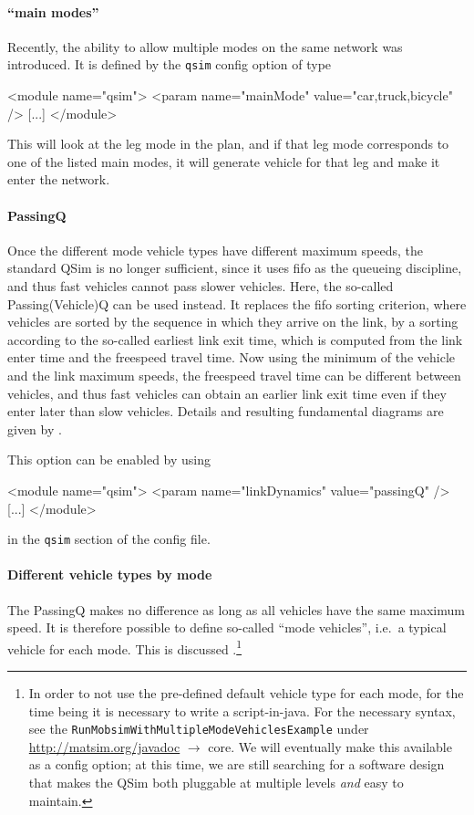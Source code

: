 \paragraph{``main modes''}
Recently, the ability to allow multiple modes on the same network was introduced.  It is defined by the \lstinline{qsim} config option of type
\begin{xml}
<module name="qsim">
   <param name="mainMode" value="car,truck,bicycle" />
   [...]
</module>
\end{xml}
This will look at the leg mode in the plan, and if that leg mode corresponds to one of the listed main modes, it will generate vehicle for that leg and make it enter the network.


\paragraph{PassingQ} Once the different mode vehicle types have different maximum speeds, the standard QSim is no longer sufficient, since it uses \acrfull{fifo} as the queueing discipline, and thus fast vehicles cannot pass slower vehicles.  Here, the so-called Passing(Vehicle)Q can be used instead.  It replaces the \gls{fifo} sorting criterion, where vehicles are sorted by the sequence in which they arrive on the link, by a sorting according to the so-called earliest link exit time, which is computed from the link enter time and the freespeed travel time.  Now using the minimum of the vehicle and the link maximum speeds, the freespeed travel time can be different between vehicles, and thus fast vehicles can obtain an earlier link exit time even if they enter later than slow vehicles.  Details and resulting fundamental diagrams are given by \cite{AgarwalEtcMixedTraffic}.

This option can be enabled by using
\begin{xml}
<module name="qsim">
   <param name="linkDynamics" value="passingQ" />
   [...]
</module>
\end{xml}
in the \lstinline{qsim} section of the config file.

\paragraph{Different vehicle types by mode}

The PassingQ makes no difference as long as all vehicles have the same maximum speed.  It is therefore possible to define so-called ``mode vehicles'', i.e.\ a typical vehicle for each mode.  This is discussed .\footnote{%
%  
%
%
In order to not use the pre-defined default vehicle type for each mode, for the time being it is necessary to write a script-in-\gls{java}. For the necessary syntax, see the \lstinline{RunMobsimWithMultipleModeVehiclesExample} under \url{http://matsim.org/javadoc} $\to$ core.  We will eventually make this available as a config option; at this time, we are still searching for a software design that makes the QSim both pluggable at multiple levels \emph{and} easy to maintain.
%
}

